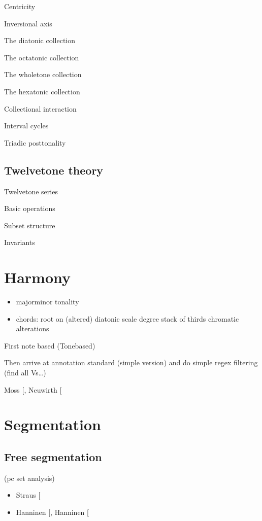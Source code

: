 \documentclass[letterpaper,10pt,english]{sphinxmanual}
\begin{document}
Centricity

Inversional axis

The diatonic collection

The octatonic collection

The whole\sphinxhyphen{}tone collection

The hexatonic collection

Collectional interaction

Interval cycles

Triadic post\sphinxhyphen{}tonality


\section{Twelve\sphinxhyphen{}tone theory}
\label{\detokenize{3_set_theory:twelve-tone-theory}}
Twelve\sphinxhyphen{}tone series

Basic operations

Subset structure

Invariants


\chapter{Harmony}
\label{\detokenize{4_harmony:harmony}}\label{\detokenize{4_harmony::doc}}\begin{itemize}
\item {} 
major\sphinxhyphen{}minor tonality

\item {} 
chords:
\sphinxhyphen{} root on (altered) diatonic scale degree
\sphinxhyphen{} stack of thirds
\sphinxhyphen{} chromatic alterations

\end{itemize}

First note based (Tone\sphinxhyphen{}based)

Then arrive at annotation standard (simple version)
and do simple regex filtering (find all Vs…)

Moss  {[}\sphinxcite{8_bibliography:id20}{]}, Neuwirth  {[}\sphinxcite{8_bibliography:id24}{]}


\chapter{Segmentation}
\label{\detokenize{5_segmentation:segmentation}}\label{\detokenize{5_segmentation::doc}}

\section{Free segmentation}
\label{\detokenize{5_segmentation:free-segmentation}}
(pc set analysis)
\begin{itemize}
\item {} 
Straus {[}\sphinxcite{8_bibliography:id3}{]}

\item {} 
Hanninen {[}\sphinxcite{8_bibliography:id18}{]}, Hanninen {[}\sphinxcite{8_bibliography:id19}{]}

\end{itemize}
\end{document}
